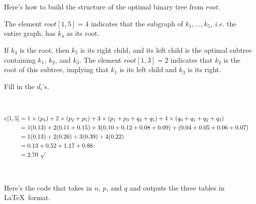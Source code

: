 \


\

Here's how to build the structure of the optimal binary tree from $root$.  

The element $root[1,5] = 4$ indicates that the subgraph of $k_1,\dots,k_5$, {\it i.e.} the entire graph, has $k_4$ as its root.  

If $k_4$ is the root, then $k_5$ is its right child, and its left child is the optimal subtree containing $k_1$, $k_2$, and $k_3$.  The element $root[1,3] = 2$ indicates that $k_2$ is the root of this subtree, implying that $k_1$ is its left child and $k_3$ is its right.  

Fill in the $d_i$'s.  

\


\begin{align*}
	e[1,5] &= 1 \times (p_4) + 2 \times (p_2 + p_5) + 3 \times (p_1 + p_3 + q_4 + q_5) + 4 \times (q_0 + q_1 + q_2 + q_3) \cr
	&= 1(0.13)  + 2(0.11 + 0.15) + 3(0.10 + 0.12 + 0.08 + 0.09) + (0.04 + 0.05 + 0.06 + 0.07) \cr
	&= 1(0.13) + 2(0.26) + 3(0.39) + 4(0.22) \cr
	&= 0.13 + 0.52 + 1.17 + 0.88 \cr
	&= 2.70 \ \surd \cr
\end{align*}

\

Here's the code that takes in $n$, $p$, and $q$ and outputs the three tables in \LaTeX \ format.  




